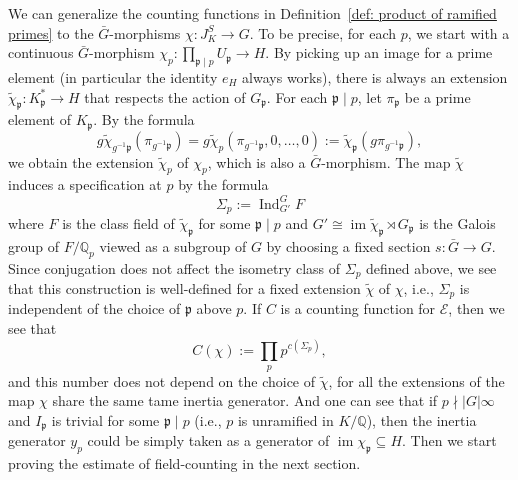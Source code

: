\documentclass{amsart}
\numberwithin{equation}{section}
\theoremstyle{plain}
\theoremstyle{definition}
\theoremstyle{remark}
\begin{document}
We can generalize the counting functions in Definition~\ref{def: product of ramified primes} to the $\bar{G}$-morphisms $\chi:J_K^S\to G$.
To be precise, for each $p$, we start with a continuous $\bar{G}$-morphism $\chi_{p}:\prod_{\mathfrak{p}\mid p}U_{\mathfrak{p}}\to H$.
By picking up an image for a prime element (in particular the identity $e_H$ always works), there is always an extension $\tilde{\chi}_{\mathfrak{p}}:K_{\mathfrak{p}}^*\to H$ that respects the action of $G_{\mathfrak{p}}$.
For each $\mathfrak{p}\mid p$, let $\pi_{\mathfrak{p}}$ be a prime element of $K_{\mathfrak{p}}$.
By the formula
\begin{equation*}
	g\tilde{\chi}_{g^{-1}\mathfrak{p}}(\pi_{g^{-1}\mathfrak{p}})=g\tilde{\chi}_p(\pi_{g^{-1}\mathfrak{p}},0,\dots,0):=\tilde{\chi}_{\mathfrak{p}}(g\pi_{g^{-1}\mathfrak{p}}),
\end{equation*} 
we obtain the extension $\tilde{\chi}_p$ of $\chi_p$, which is also a  $\bar{G}$-morphism.
The map $\tilde{\chi}$ induces a specification at $p$ by the formula
\begin{equation*}
	\Sigma_p:=\operatorname{Ind}^G_{G'}F
\end{equation*}
where $F$ is the class field of $\tilde{\chi}_{\mathfrak{p}}$ for some $\mathfrak{p}\mid p$ and $G'\cong\operatorname{im}\tilde{\chi}_{\mathfrak{p}}\rtimes G_{\mathfrak{p}}$ is the Galois group of $F/\mathbb{Q}_p$ viewed as a subgroup of $G$ by choosing a fixed section $s:\bar{G}\to G$.
Since conjugation does not affect the isometry class of $\Sigma_p$ defined above, we see that this construction is well-defined for a fixed extension $\tilde{\chi}$ of $\chi$, i.e., $\Sigma_p$ is independent of the choice of $\mathfrak{p}$ above $p$.
If $C$ is a counting function for $\mathcal{E}$, then we see that
\begin{equation}\label{eqn: counting function for morphisms}
	C(\chi):=\prod_{p}p^{c(\Sigma_p)},
\end{equation}
and this number does not depend on the choice of $\tilde{\chi}$, for all the extensions of the map $\chi$ share the same tame inertia generator.
And one can see that if $p\nmid\lvert G\rvert\infty$ and $I_{\mathfrak{p}}$ is trivial for some $\mathfrak{p}\mid p$ (i.e., $p$ is unramified in $K/\mathbb{Q}$), then the inertia generator $y_p$ could be simply taken as a generator of $\operatorname{im}\chi_{\mathfrak{p}}\subseteq H$.
Then we start proving the estimate of field-counting in the next section.
\end{document}
